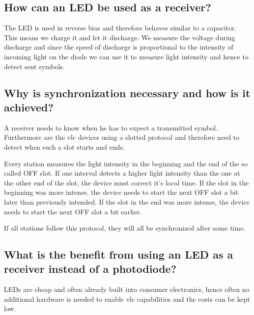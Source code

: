 \subsection*{How can an LED be used as a receiver?}
The LED is used in reverse bias and therefore behaves similar to a capacitor. This means we charge it and let it discharge. We measure the voltage during discharge and since the speed of discharge is proportional to the intensity of incoming light on the diode we can use it to measure light intensity and hence to detect sent symbols.
\subsection*{Why is synchronization necessary and how is it achieved?}
A receiver needs to know when he has to expect a transmitted symbol. Furthermore are the vlc devices using a slotted protocol and therefore need to detect when such a slot starts and ends.

Every station measures the light intensity in the beginning and the end of the so called OFF slot. If one interval detects a higher light intensity than the one at the other end of the slot, the device must correct it's local time. If the slot in the beginning was more intense, the device needs to start the next OFF slot a bit later than previously intended. If the slot in the end was more intense, the device needs to start the next OFF slot a bit earlier.

If all stations follow this protocol, they will all be synchronized after some time.
\subsection*{What is	the	benefit	from using an LED as a receiver instead of a photodiode? }
LEDs are cheap and often already built into consumer electronics, hence often no additional hardware is
needed to enable vlc capabilities and the costs can be kept low.